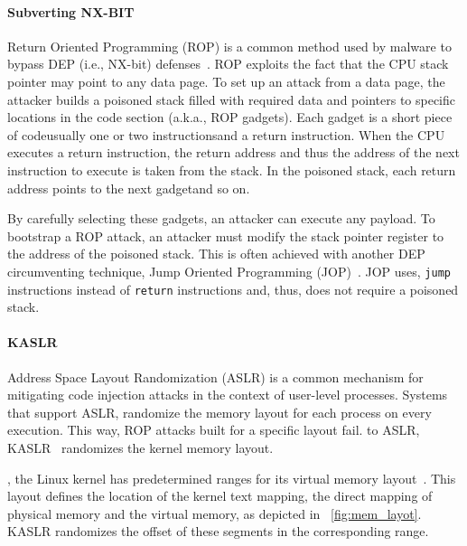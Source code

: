 \paragraph{Subverting NX-BIT}

Return Oriented Programming (ROP) is a common method used by malware to bypass DEP (i.e., NX-bit) defenses~\cite{RBSS12}. ROP exploits the fact that the CPU stack pointer may point to any data page. To set up an attack from a data page, the attacker builds a poisoned stack filled with required data and pointers to specific locations in the code section (a.k.a., ROP gadgets). Each gadget is a short piece of code\DIFdelbegin \DIFdel{(}\DIFdelend \DIFaddbegin \DIFadd{, }\DIFaddend usually one or two instructions\DIFdelbegin \DIFdel{) }\DIFdelend \DIFaddbegin \DIFadd{, }\DIFaddend and a return instruction. When the CPU executes a return instruction, the return address and thus the address of the next instruction to execute is taken from the stack. In the poisoned stack, each return address points to the next gadget\DIFaddbegin \DIFadd{, }\DIFaddend and so on. 

By carefully selecting these gadgets, an attacker can execute any payload. To bootstrap a ROP attack, an attacker must modify the stack pointer register to the address of the poisoned stack. This is often achieved with another DEP circumventing technique, \DIFdelbegin {}\DIFdelend \DIFaddbegin {}\DIFaddend Jump Oriented Programming (JOP)~\cite{BJFL11}. JOP uses, \texttt{jump} instructions instead of \texttt{return} instructions and, thus, does not require a poisoned stack.

\paragraph{KASLR}\label{sec:kaslr}

Address Space Layout Randomization (ASLR) is a common mechanism for mitigating code injection attacks in the context of user-level processes. Systems that support ASLR, randomize the memory layout for each process on every execution. This way, ROP attacks built for a specific layout fail. \DIFdelbegin {}\DIFdelend \DIFaddbegin {}\DIFaddend to ASLR, KASLR~\cite{kalsr} randomizes the kernel memory layout.

\DIFdelbegin {}\DIFdelend \DIFaddbegin {}\DIFaddend , the Linux kernel has predetermined ranges for its virtual memory layout~\cite{mem_layout}. This layout defines the location of the kernel text mapping, \DIFaddbegin {}\DIFaddend the direct mapping of physical memory and the virtual memory, as depicted in \DIFdelbegin {}\DIFdelend \DIFaddbegin {}\DIFaddend ~\ref{fig:mem_layot}. \DIFaddbegin {}\DIFaddend KASLR randomizes the offset of these segments in the corresponding range\DIFdelbegin {}\DIFdelend .

